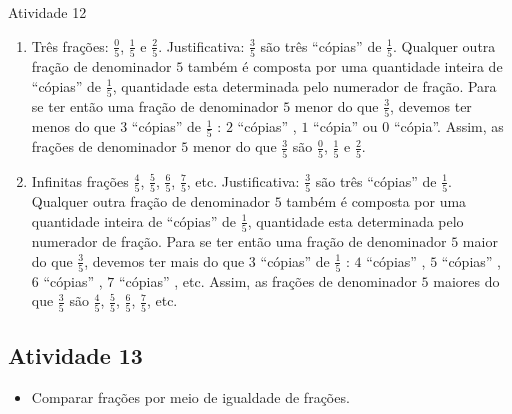 \begin{multicols}{2}
\begin{resposta*}{Atividade 12}
\begin{enumerate} [\quad a)] %
    \item       Três frações:       $\frac{0}{5}$,       $\frac{1}{5}$       e
    $\frac{2}{5}$. Justificativa:       $\frac{3}{5}$       são três
``cópias''       de       $\frac{1}{5}$. Qualquer outra fração de denominador
   $5$       também é composta por uma quantidade inteira de       ``cópias''
   de       $\frac{1}{5}$, quantidade esta determinada pelo numerador de fração.
Para se ter então uma fração de denominador       $5$       menor do que
$\frac{3}{5}$, devemos ter menos do que       $3$             ``cópias''
de       $\frac{1}{5}$      :       $2$             ``cópias''      ,       $1$
           ``cópia''       ou       $0$             ``cópia''. Assim, as
frações de denominador       $5$       menor do que       $\frac{3}{5}$
são       $\frac{0}{5}$,       $\frac{1}{5}$       e       $\frac{2}{5}$.
    \item       Infinitas frações       $\frac{4}{5}$,       $\frac{5}{5}$,
 $\frac{6}{5}$,       $\frac{7}{5}$, etc. Justificativa:       $\frac{3}{5}$
  são três       ``cópias''       de       $\frac{1}{5}$. Qualquer outra fração
de denominador       $5$       também é composta por uma quantidade inteira de
    ``cópias''       de       $\frac{1}{5}$, quantidade esta determinada pelo
numerador de fração. Para se ter então uma fração de denominador       $5$
maior do que       $\frac{3}{5}$, devemos ter mais do que       $3$
``cópias''       de       $\frac{1}{5}$      :       $4$             ``cópias''
    ,       $5$             ``cópias''      ,       $6$             ``cópias''
   ,       $7$             ``cópias''      , etc. Assim, as frações de
denominador       $5$       maiores do que       $\frac{3}{5}$       são
$\frac{4}{5}$,       $\frac{5}{5}$,       $\frac{6}{5}$,       $\frac{7}{5}$,
etc.
\end{enumerate} %

\end{resposta*}



\subsection{Atividade 13}

\begin{itemize} %
    \item       Comparar frações por meio de igualdade de frações.
\end{itemize} %



\end{multicols}

